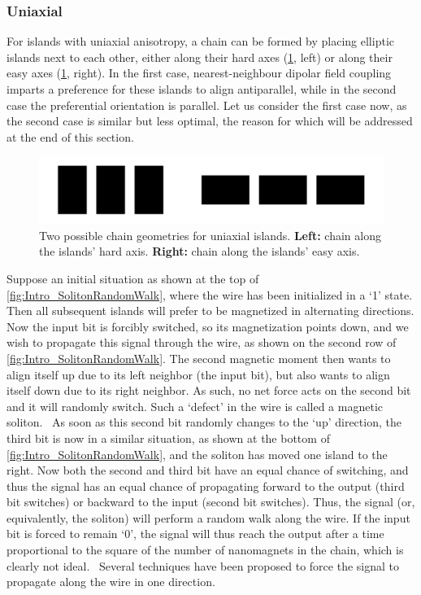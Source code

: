 \documentclass[11pt,a4paper,english]{article}
\begin{document}
\subsubsection{Uniaxial}
For islands with uniaxial anisotropy, a chain can be formed by placing elliptic islands next to each other, either along their hard axes (\cref{fig:Intro_IslandEllipticChainGeometries}, left) or along their easy axes (\cref{fig:Intro_IslandEllipticChainGeometries}, right). In the first case, nearest-neighbour dipolar field coupling imparts a preference for these islands to align antiparallel, while in the second case the preferential orientation is parallel. Let us consider the first case now, as the second case is similar but less optimal, the reason for which will be addressed at the end of this section.
\begin{figure} %
    \centering
    \includegraphics[width=0.5\columnwidth]{Figures/Introduction/Chains_geometries.pdf}
    \caption{Two possible chain geometries for uniaxial islands. \textbf{Left:} chain along the islands' hard axis. \textbf{Right:} chain along the islands' easy axis.}
    \label{fig:Intro_IslandEllipticChainGeometries}
\end{figure} \par
Suppose an initial situation as shown at the top of \cref{fig:Intro_SolitonRandomWalk}, where the wire has been initialized in a `1' state. Then all subsequent islands will prefer to be magnetized in alternating directions. Now the input bit is forcibly switched, so its magnetization points down, and we wish to propagate this signal through the wire, as shown on the second row of \cref{fig:Intro_SolitonRandomWalk}. The second magnetic moment then wants to align itself up due to its left neighbor (the input bit), but also wants to align itself down due to its right neighbor. As such, no net force acts on the second bit and it will randomly switch. Such a `defect' in the wire is called a magnetic soliton.~\cite{MQCA_RoomTemp} As soon as this second bit randomly changes to the `up' direction, the third bit is now in a similar situation, as shown at the bottom of \cref{fig:Intro_SolitonRandomWalk}, and the soliton has moved one island to the right. Now both the second and third bit have an equal chance of switching, and thus the signal has an equal chance of propagating forward to the output (third bit switches) or backward to the input (second bit switches). Thus, the signal (or, equivalently, the soliton) will perform a random walk along the wire. If the input bit is forced to remain `0', the signal will thus reach the output after a time proportional to the square of the number of nanomagnets in the chain, which is clearly not ideal.~\cite{Wolfram_RandomWalk} Several techniques have been proposed to force the signal to propagate along the wire in one direction.
\end{document}
